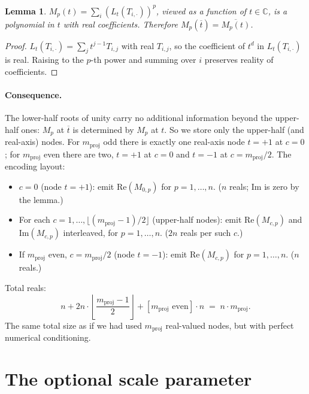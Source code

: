 \documentclass[a4paper,11pt]{article}
\newtheorem{lemma}{Lemma}
\begin{document}
\begin{lemma}
$M_p(t) = \sum_i (L_t(T_{i, \cdot}))^p$, viewed as a function of
$t \in \mathbb{C}$, is a polynomial in $t$ with real coefficients.
Therefore $M_p(\overline{t}) = \overline{M_p(t)}$.
\end{lemma}

\begin{proof}
$L_t(T_{i, \cdot}) = \sum_j t^{j-1} T_{i, j}$ with real $T_{i, j}$, so
the coefficient of $t^d$ in $L_t(T_{i, \cdot})$ is real.  Raising to
the $p$-th power and summing over $i$ preserves reality of
coefficients.
\end{proof}

\paragraph{Consequence.}
The lower-half roots of unity carry no additional information beyond
the upper-half ones: $M_p$ at $\overline{t}$ is determined by $M_p$ at
$t$.  So we store only the upper-half (and real-axis) nodes.  For
$m_{\text{proj}}$ odd there is exactly one real-axis node $t = +1$ at
$c = 0$; for $m_{\text{proj}}$ even there are two, $t = +1$ at
$c = 0$ and $t = -1$ at $c = m_{\text{proj}}/2$.  The encoding layout:

\begin{itemize}[nosep]
  \item $c = 0$ (node $t = +1$): emit $\mathrm{Re}(M_{0, p})$ for
        $p = 1, \ldots, n$.  ($n$ reals; $\mathrm{Im}$ is zero by the
        lemma.)
  \item For each $c = 1, \ldots, \lfloor (m_{\text{proj}} - 1)/2 \rfloor$
        (upper-half nodes): emit $\mathrm{Re}(M_{c, p})$ and
        $\mathrm{Im}(M_{c, p})$ interleaved, for $p = 1, \ldots, n$.
        ($2n$ reals per such $c$.)
  \item If $m_{\text{proj}}$ even, $c = m_{\text{proj}}/2$ (node
        $t = -1$): emit $\mathrm{Re}(M_{c, p})$ for $p = 1, \ldots, n$.
        ($n$ reals.)
\end{itemize}

Total reals:
\[
  n + 2n \cdot \left\lfloor \frac{m_{\text{proj}} - 1}{2}\right\rfloor
    + [m_{\text{proj}} \text{ even}] \cdot n
  \;=\; n \cdot m_{\text{proj}}.
\]
The same total size as if we had used $m_{\text{proj}}$ real-valued
nodes, but with perfect numerical conditioning.

\section{The optional scale parameter}
\end{document}

